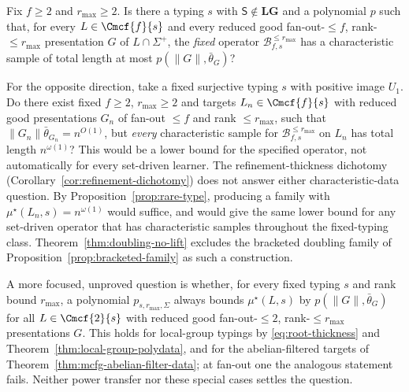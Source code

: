 \begin{remark}
\begin{openproblem}
\label{op:fanout-two}
Fix $f\ge2$ and $r_{\max}\ge2$.  Is there a typing $s$ with
$\mathsf S\notin\mathbf{LG}$ and a polynomial $p$ such that, for every
$L\in\Cmcf{f}{s}$ and every reduced good fan-out-$\le f$, rank-$\le r_{\max}$
presentation $G$ of $L\cap\Sigma^+$, the \emph{fixed} operator
$\mathcal B^{\le r_{\max}}_{f,s}$ has a characteristic sample of total length
at most $p(\|G\|,\bar\theta_G)$?

For the opposite direction, take a fixed surjective typing $s$ with
positive image $U_1$.  Do there exist fixed $f\ge2$, $r_{\max}\ge2$ and
targets $L_n\in\Cmcf{f}{s}$ with reduced good presentations $G_n$ of
fan-out $\le f$ and rank $\le r_{\max}$, such that
$\|G_n\|\bar\theta_{G_n}=n^{O(1)}$, but \emph{every} characteristic sample
for $\mathcal B^{\le r_{\max}}_{f,s}$ on $L_n$ has total length
$n^{\omega(1)}$?  This would be a lower bound for the specified operator,
not automatically for every set-driven learner.  The refinement-thickness
dichotomy (Corollary~\ref{cor:refinement-dichotomy}) does not answer either
characteristic-data question. By Proposition~\ref{prop:rare-type},
producing a family with $\mu^\star(L_n,s)=n^{\omega(1)}$
would suffice, and would give the same lower bound for any
set-driven operator that has characteristic samples throughout the
fixed-typing class. Theorem~\ref{thm:doubling-no-lift} excludes the
bracketed doubling family of Proposition~\ref{prop:bracketed-family} as
such a construction.
\end{openproblem}

A more focused, unproved question is whether, for every fixed typing
$s$ and rank bound $r_{\max}$, a polynomial
$p_{s,r_{\max},\Sigma}$ always bounds
$\mu^\star(L,s)$ by $p(\|G\|,\bar\theta_G)$ for all
$L\in\Cmcf{2}{s}$ with reduced good fan-out-$\le2$,
rank-$\le r_{\max}$ presentations $G$.
This holds for local-group typings by
\eqref{eq:root-thickness} and Theorem~\ref{thm:local-group-polydata},
and for the abelian-filtered targets of
Theorem~\ref{thm:mcfg-abelian-filter-data}; at fan-out one the
analogous statement fails. Neither power transfer nor these special
cases settles the question.


\end{remark}
